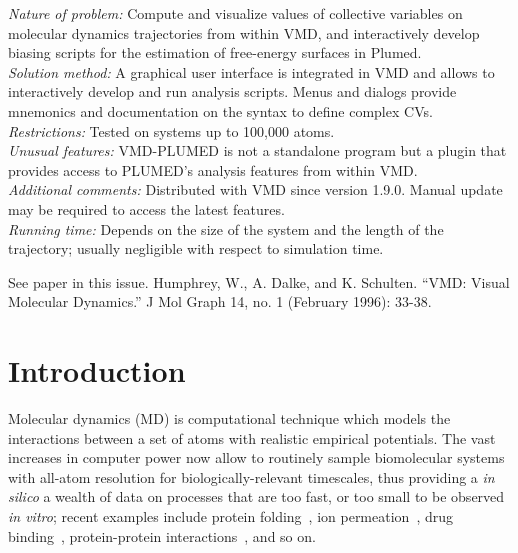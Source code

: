 \documentclass[preprint,12pt]{elsarticle}
\begin{document}
\begin{small}
  {\em Nature of problem:} Compute and visualize values of collective
  variables on molecular dynamics trajectories from within VMD, and
  interactively develop biasing scripts for the estimation of
  free-energy surfaces in Plumed.
  \\
  {\em Solution method:} A graphical user interface is integrated in
  VMD and allows to interactively develop and run analysis scripts.
  Menus and dialogs provide mnemonics and documentation on the syntax
  to define complex CVs.
  \\
  {\em Restrictions:}
  Tested on systems up to 100,000 atoms. \\
  {\em Unusual features:} VMD-PLUMED is not a standalone program but a
  plugin that provides access to PLUMED's analysis features from within VMD. \\
  {\em Additional comments:} Distributed with VMD since version 1.9.0.
  Manual  update may be required  to access the latest features.   \\
  {\em Running time:} Depends on the size of the system and the length
  of the trajectory; usually negligible with respect to simulation time.  \\
\begin{thebibliography}{0}
See paper in this issue.
Humphrey, W., A. Dalke, and K. Schulten. ``VMD: Visual Molecular Dynamics.'' J Mol Graph 14, no. 1 (February 1996): 33-38. 
\end{thebibliography}

\end{small}



\section{Introduction}

Molecular dynamics (MD) is computational technique which models the
interactions between a set of atoms with realistic empirical
potentials. The vast increases in computer power now allow to
routinely sample biomolecular systems with all-atom resolution for
biologically-relevant timescales, thus providing a \emph{in silico} a
wealth of data on processes that are too fast, or too small to be
observed \emph{in vitro}; recent examples include protein
folding~\cite{Lindorff-Larsen_Piana_Dror_Shaw_2011}, ion permeation~\cite{Jensen_Jogini_Borhani_Leffler_Dror_Shaw_2012},
drug binding~\cite{Shan_Kim_Eastwood_Dror_Seeliger_Shaw_2011,Buch_Giorgino_2011}, protein-protein interactions~\cite{Ahmad_Gu_Helms_2008,Giorgino_Buch_2012}, and so on.
\end{document}

